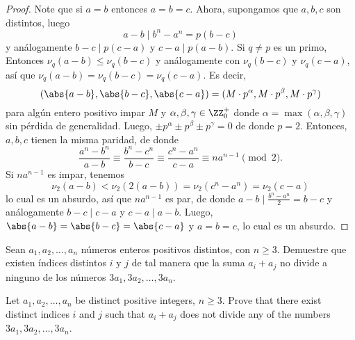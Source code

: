 \begin{proof}
	Note que si $a=b$ entonces $a=b=c$. Ahora, supongamos que $a,b,c$ son distintos, luego
	\[a-b\mid b^n-a^n=p(b-c)\]
	y análogamente $b-c\mid p(c-a)$ y $c-a\mid p(a-b)$. Si $q\ne p$ es un primo, Entonces $\nu_q(a-b)\le\nu_q(b-c)$ y análogamente con $\nu_q(b-c)$ y $\nu_q(c-a)$, así que $\nu_q(a-b)=\nu_q(b-c)=\nu_q(c-a)$. Es decir,
	\[(\abs{a-b},\abs{b-c},\abs{c-a})=(M\cdot p^\alpha,M\cdot p^\beta,M\cdot p^\gamma)\]
	para algún entero positivo impar $M$ y $\alpha,\beta,\gamma\in\ZZ^+_0$ donde $\alpha=\max(\alpha,\beta,\gamma)$ sin pérdida de generalidad. Luego, $\pm p^\alpha\pm p^\beta\pm p^\gamma=0$ de donde $p=2$. Entonces, $a,b,c$ tienen la misma paridad, de donde
	\[\frac{a^n-b^n}{a-b}\equiv\frac{b^n-c^n}{b-c}\equiv\frac{c^n-a^n}{c-a}\equiv na^{n-1}\pmod 2.\]
	Si $na^{n-1}$ es impar, tenemos
	\[\nu_2(a-b)<\nu_2(2(a-b))=\nu_2(c^n-a^n)=\nu_2(c-a)\]
	lo cual es un absurdo, así que $na^{n-1}$ es par, de donde
	$a-b\mid\frac{b^n-a^n}{2}=b-c$ y análogamente $b-c\mid c-a$ y $c-a\mid a-b$. Luego, $\abs{a-b}=\abs{b-c}=\abs{c-a}$ y $a=b=c$, lo cual es un absurdo.
\end{proof}

\begin{probEG}[ISL 2008/N2]
	Sean $a_1,a_2,\dots,a_n$ números enteros positivos distintos, con $n\ge 3$. Demuestre que existen índices distintos $i$ y $j$ de tal manera que la suma $a_i+a_j$ no divide a ninguno de los números $3a_1,3a_2,\dots,3a_n$.
	\begin{hint}
		Let $a_1,a_2,\dots,a_n$ be distinct positive integers, $n\ge 3$. Prove that there exist distinct indices $i$ and $j$ such that $a_i+a_j$ does not divide any of the numbers $3a_1,3a_2,\dots,3a_n$.
	\end{hint}
\end{probEG}

